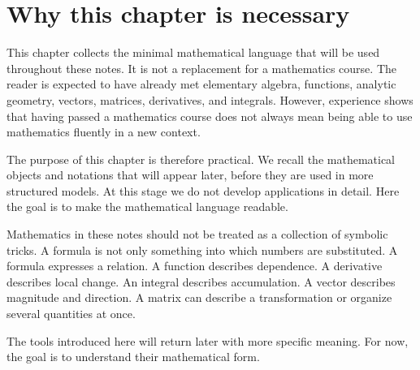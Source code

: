 \section{Why this chapter is necessary}

This chapter collects the minimal mathematical language that will be used throughout these notes. It is not a replacement for a mathematics course. The reader is expected to have already met elementary algebra, functions, analytic geometry, vectors, matrices, derivatives, and integrals. However, experience shows that having passed a mathematics course does not always mean being able to use mathematics fluently in a new context.

The purpose of this chapter is therefore practical. We recall the mathematical objects and notations that will appear later, before they are used in more structured models. At this stage we do not develop applications in detail. Here the goal is to make the mathematical language readable.

Mathematics in these notes should not be treated as a collection of symbolic tricks. A formula is not only something into which numbers are substituted. A formula expresses a relation. A function describes dependence. A derivative describes local change. An integral describes accumulation. A vector describes magnitude and direction. A matrix can describe a transformation or organize several quantities at once.

The tools introduced here will return later with more specific meaning. For now, the goal is to understand their mathematical form.
